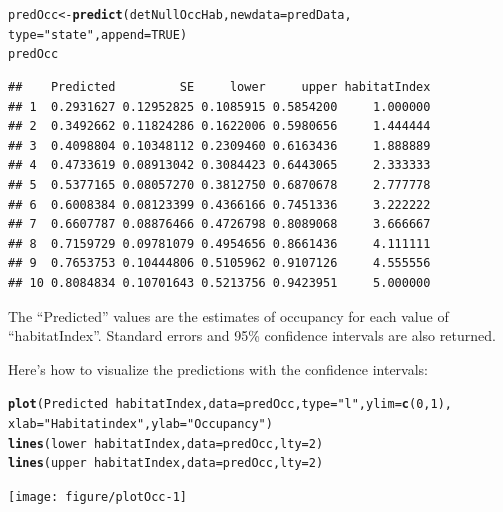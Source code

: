 \documentclass[12pt]{article}\usepackage[]{graphicx}\usepackage[]{color}
\makeatletter
\newcommand{\hlnum}[1]{\textcolor[rgb]{0.686,0.059,0.569}{#1}}%
\newcommand{\hlstr}[1]{\textcolor[rgb]{0.192,0.494,0.8}{#1}}%
\newcommand{\hlopt}[1]{\textcolor[rgb]{0,0,0}{#1}}%
\newcommand{\hlstd}[1]{\textcolor[rgb]{0.345,0.345,0.345}{#1}}%
\newcommand{\hlkwb}[1]{\textcolor[rgb]{0.69,0.353,0.396}{#1}}%
\newcommand{\hlkwc}[1]{\textcolor[rgb]{0.333,0.667,0.333}{#1}}%
\newcommand{\hlkwd}[1]{\textcolor[rgb]{0.737,0.353,0.396}{\textbf{#1}}}%
\newenvironment{kframe}{%
 \def\at@end@of@kframe{}%
 \ifinner\ifhmode%
  \def\at@end@of@kframe{\end{minipage}}%
  \begin{minipage}{\columnwidth}%
 \fi\fi%
 \def\FrameCommand##1{\hskip\@totalleftmargin \hskip-\fboxsep
 \colorbox{shadecolor}{##1}\hskip-\fboxsep
     \hskip-\linewidth \hskip-\@totalleftmargin \hskip\columnwidth}%
 \MakeFramed {\advance\hsize-\width
   \@totalleftmargin\z@ \linewidth\hsize
   \@setminipage}}%
 {\par\unskip\endMakeFramed%
 \at@end@of@kframe}
\newenvironment{knitrout}{}{} %
\makeatother
\begin{document}
\begin{knitrout}
\color{fgcolor}\begin{kframe}
\begin{alltt}
\hlstd{predOcc} \hlkwb{<-} \hlkwd{predict}\hlstd{(detNullOccHab,} \hlkwc{newdata}\hlstd{=predData,}
                   \hlkwc{type}\hlstd{=}\hlstr{"state"}\hlstd{,} \hlkwc{append}\hlstd{=}\hlnum{TRUE}\hlstd{)}
\hlstd{predOcc}
\end{alltt}
\begin{verbatim}
##    Predicted         SE     lower     upper habitatIndex
## 1  0.2931627 0.12952825 0.1085915 0.5854200     1.000000
## 2  0.3492662 0.11824286 0.1622006 0.5980656     1.444444
## 3  0.4098804 0.10348112 0.2309460 0.6163436     1.888889
## 4  0.4733619 0.08913042 0.3084423 0.6443065     2.333333
## 5  0.5377165 0.08057270 0.3812750 0.6870678     2.777778
## 6  0.6008384 0.08123399 0.4366166 0.7451336     3.222222
## 7  0.6607787 0.08876466 0.4726798 0.8089068     3.666667
## 8  0.7159729 0.09781079 0.4954656 0.8661436     4.111111
## 9  0.7653753 0.10444806 0.5105962 0.9107126     4.555556
## 10 0.8084834 0.10701643 0.5213756 0.9423951     5.000000
\end{verbatim}
\end{kframe}
\end{knitrout}

The ``Predicted'' values are the estimates of occupancy for each value of ``habitatIndex''. Standard errors and 95\% confidence intervals are also returned.

Here's how to visualize the predictions with the confidence intervals:

\begin{knitrout}
\color{fgcolor}\begin{kframe}
\begin{alltt}
\hlkwd{plot}\hlstd{(Predicted} \hlopt{~} \hlstd{habitatIndex,} \hlkwc{data}\hlstd{=predOcc,} \hlkwc{type}\hlstd{=}\hlstr{"l"}\hlstd{,} \hlkwc{ylim}\hlstd{=}\hlkwd{c}\hlstd{(}\hlnum{0}\hlstd{,}\hlnum{1}\hlstd{),}
     \hlkwc{xlab}\hlstd{=}\hlstr{"Habitat index"}\hlstd{,} \hlkwc{ylab}\hlstd{=}\hlstr{"Occupancy"}\hlstd{)}
\hlkwd{lines}\hlstd{(lower} \hlopt{~} \hlstd{habitatIndex,} \hlkwc{data}\hlstd{=predOcc,} \hlkwc{lty}\hlstd{=}\hlnum{2}\hlstd{)}
\hlkwd{lines}\hlstd{(upper} \hlopt{~} \hlstd{habitatIndex,} \hlkwc{data}\hlstd{=predOcc,} \hlkwc{lty}\hlstd{=}\hlnum{2}\hlstd{)}
\end{alltt}
\end{kframe}

{\centering \texttt{[image: figure/plotOcc-1]} 

}



\end{knitrout}
\end{document}

